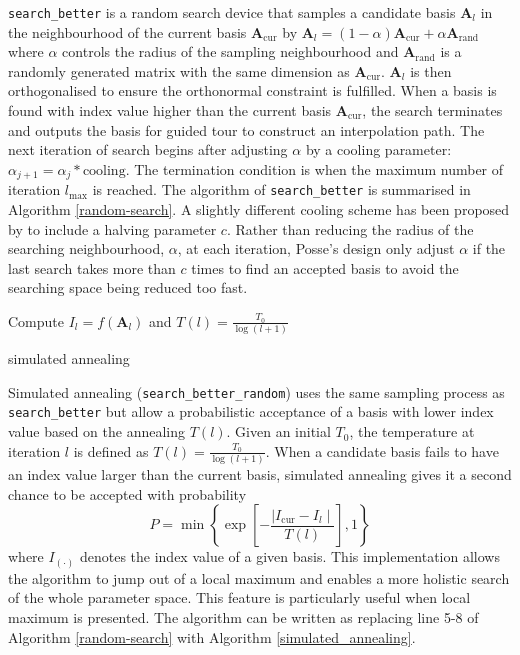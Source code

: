\documentclass[12pt]{article}
\begin{document}
\texttt{search\_better} is a random search device that samples a candidate basis \(\mathbf{A}_{l}\) in the neighbourhood of the current basis \(\mathbf{A}_{\text{cur}}\) by \(\mathbf{A}_{l} = (1- \alpha)\mathbf{A}_{\text{cur}} + \alpha \mathbf{A}_{\text{rand}}\) where \(\alpha\) controls the radius of the sampling neighbourhood and \(\mathbf{A}_{\text{rand}}\) is a randomly generated matrix with the same dimension as \(\mathbf{A}_{\text{cur}}\). \(\mathbf{A}_{l}\) is then orthogonalised to ensure the orthonormal constraint is fulfilled. When a basis is found with index value higher than the current basis \(\mathbf{A}_{\text{cur}}\), the search terminates and outputs the basis for guided tour to construct an interpolation path. The next iteration of search begins after adjusting \(\alpha\) by a cooling parameter: \(\alpha_{j+1} = \alpha_j * \text{cooling}\). The termination condition is when the maximum number of iteration \(l_{\max}\) is reached. The algorithm of \texttt{search\_better} is summarised in Algorithm \ref{random-search}. A slightly different cooling scheme has been proposed by \citet{posse1995projection} to include a halving parameter \(c\). Rather than reducing the radius of the searching neighbourhood, \(\alpha\), at each iteration, Posse's design only adjust \(\alpha\) if the last search takes more than \(c\) times to find an accepted basis to avoid the searching space being reduced too fast.

\begin{algorithm}
\SetAlgoLined
    Compute $I_{l} = f(\mathbf{A}_{l})$ and $T(l) = \frac{T_0}{\log(l + 1)}$\;
  \caption{simulated annealing}
  \label{simulated_annealing}
\end{algorithm}

Simulated annealing (\texttt{search\_better\_random}) \citep[\citet{bertsimas1993simulated}]{kirkpatrick1983optimization} uses the same sampling process as \texttt{search\_better} but allow a probabilistic acceptance of a basis with lower index value based on the annealing \(T(l)\). Given an initial \(T_0\), the temperature at iteration \(l\) is defined as \(T(l) = \frac{T_0}{\log(l + 1)}\). When a candidate basis fails to have an index value larger than the current basis, simulated annealing gives it a second chance to be accepted with probability \[P= \min\left\{\exp\left[-\frac{\mid I_{\text{cur}} - I_{l} \mid}{T(l)}\right],1\right\}\] where \(I_{(\cdot)}\) denotes the index value of a given basis. This implementation allows the algorithm to jump out of a local maximum and enables a more holistic search of the whole parameter space. This feature is particularly useful when local maximum is presented. The algorithm can be written as replacing line 5-8 of Algorithm \ref{random-search} with Algorithm \ref{simulated_annealing}.
\end{document}
